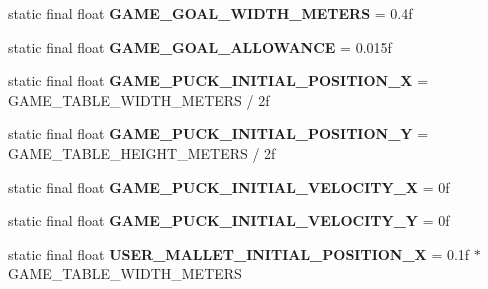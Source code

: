 \begin{DoxyCompactItemize}
\item 
\hypertarget{classairhockeyjava_1_1game_1_1_constants_a27d0f07d86cabdb4920989990f399990}{}static final float {\bfseries G\+A\+M\+E\+\_\+\+G\+O\+A\+L\+\_\+\+W\+I\+D\+T\+H\+\_\+\+M\+E\+T\+E\+R\+S} = 0.\+4f\label{classairhockeyjava_1_1game_1_1_constants_a27d0f07d86cabdb4920989990f399990}

\item 
\hypertarget{classairhockeyjava_1_1game_1_1_constants_a5cc00f82a19729741417bbde3340ce18}{}static final float {\bfseries G\+A\+M\+E\+\_\+\+G\+O\+A\+L\+\_\+\+A\+L\+L\+O\+W\+A\+N\+C\+E} = 0.\+015f\label{classairhockeyjava_1_1game_1_1_constants_a5cc00f82a19729741417bbde3340ce18}

\item 
\hypertarget{classairhockeyjava_1_1game_1_1_constants_a2549044d092fe6287efce1127369caa5}{}static final float {\bfseries G\+A\+M\+E\+\_\+\+P\+U\+C\+K\+\_\+\+I\+N\+I\+T\+I\+A\+L\+\_\+\+P\+O\+S\+I\+T\+I\+O\+N\+\_\+\+X} = G\+A\+M\+E\+\_\+\+T\+A\+B\+L\+E\+\_\+\+W\+I\+D\+T\+H\+\_\+\+M\+E\+T\+E\+R\+S / 2f\label{classairhockeyjava_1_1game_1_1_constants_a2549044d092fe6287efce1127369caa5}

\item 
\hypertarget{classairhockeyjava_1_1game_1_1_constants_a0950981b564155c1a09eba945e61b6b4}{}static final float {\bfseries G\+A\+M\+E\+\_\+\+P\+U\+C\+K\+\_\+\+I\+N\+I\+T\+I\+A\+L\+\_\+\+P\+O\+S\+I\+T\+I\+O\+N\+\_\+\+Y} = G\+A\+M\+E\+\_\+\+T\+A\+B\+L\+E\+\_\+\+H\+E\+I\+G\+H\+T\+\_\+\+M\+E\+T\+E\+R\+S / 2f\label{classairhockeyjava_1_1game_1_1_constants_a0950981b564155c1a09eba945e61b6b4}

\item 
\hypertarget{classairhockeyjava_1_1game_1_1_constants_a2b8903e7041ca8b6a455e93dff512f00}{}static final float {\bfseries G\+A\+M\+E\+\_\+\+P\+U\+C\+K\+\_\+\+I\+N\+I\+T\+I\+A\+L\+\_\+\+V\+E\+L\+O\+C\+I\+T\+Y\+\_\+\+X} = 0f\label{classairhockeyjava_1_1game_1_1_constants_a2b8903e7041ca8b6a455e93dff512f00}

\item 
\hypertarget{classairhockeyjava_1_1game_1_1_constants_a8f772a7fe0bd53967801b67e61750a3d}{}static final float {\bfseries G\+A\+M\+E\+\_\+\+P\+U\+C\+K\+\_\+\+I\+N\+I\+T\+I\+A\+L\+\_\+\+V\+E\+L\+O\+C\+I\+T\+Y\+\_\+\+Y} = 0f\label{classairhockeyjava_1_1game_1_1_constants_a8f772a7fe0bd53967801b67e61750a3d}

\item 
\hypertarget{classairhockeyjava_1_1game_1_1_constants_aebb5484c723f3bf11aef4bb19248c5c3}{}static final float {\bfseries U\+S\+E\+R\+\_\+\+M\+A\+L\+L\+E\+T\+\_\+\+I\+N\+I\+T\+I\+A\+L\+\_\+\+P\+O\+S\+I\+T\+I\+O\+N\+\_\+\+X} = 0.\+1f $\ast$ G\+A\+M\+E\+\_\+\+T\+A\+B\+L\+E\+\_\+\+W\+I\+D\+T\+H\+\_\+\+M\+E\+T\+E\+R\+S\label{classairhockeyjava_1_1game_1_1_constants_aebb5484c723f3bf11aef4bb19248c5c3}


\end{DoxyCompactItemize}
